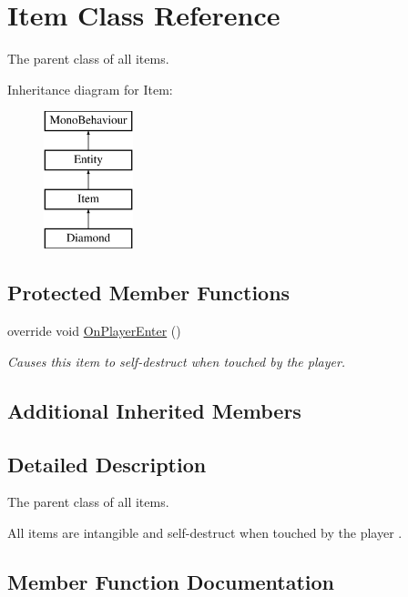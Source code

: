 \hypertarget{class_item}{}\section{Item Class Reference}
\label{class_item}


The parent class of all items.  


Inheritance diagram for Item\+:\begin{figure}[H]
\begin{center}
\leavevmode
\includegraphics[height=4.000000cm]{class_item}
\end{center}
\end{figure}
\subsection*{Protected Member Functions}
\begin{DoxyCompactItemize}
\item 
override void \mbox{\hyperlink{class_item_a81c3deb2aa480e2759a9193822d4b7e8}{On\+Player\+Enter}} ()
\begin{DoxyCompactList}\small\item\em Causes this item to self-\/destruct when touched by the player. \end{DoxyCompactList}\end{DoxyCompactItemize}
\subsection*{Additional Inherited Members}


\subsection{Detailed Description}
The parent class of all items. 

All items are intangible and self-\/destruct when touched by the player . 

\subsection{Member Function Documentation}
\mbox{\label{class_item_a81c3deb2aa480e2759a9193822d4b7e8}} 
